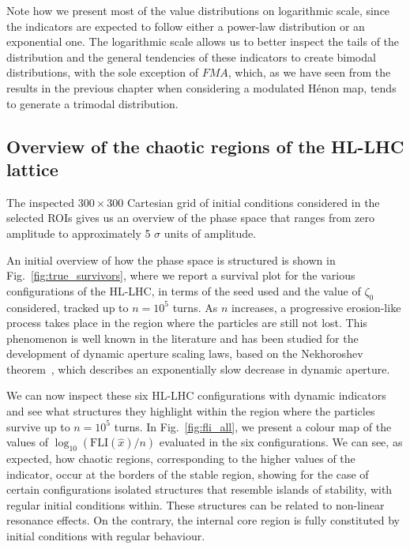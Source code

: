 Note how we present most of the value distributions on logarithmic scale, since the indicators are expected to follow either a power-law distribution or an exponential one. The logarithmic scale allows us to better inspect the tails of the distribution and the general tendencies of these indicators to create bimodal distributions, with the sole exception of $FMA$, which, as we have seen from the results in the previous chapter when considering a modulated Hénon map, tends to generate a trimodal distribution.

\subsection{Overview of the chaotic regions of the HL-LHC lattice}

The inspected $300\times300$ Cartesian grid of initial conditions considered in the selected ROIs gives us an overview of the phase space that ranges from zero amplitude to approximately 5 $\sigma$ units of amplitude.

An initial overview of how the phase space is structured is shown in Fig.~\ref{fig:true_survivors}, where we report a survival plot for the various configurations of the HL-LHC, in terms of the seed used and the value of $\zeta_0$ considered, tracked up to $n=10^5$ turns. As $n$ increases, a progressive erosion-like process takes place in the region where the particles are still not lost. This phenomenon is well known in the literature and has been studied for the development of dynamic aperture scaling laws, based on the Nekhoroshev theorem~\cite{Bazzani:2019csk}, which describes an exponentially slow decrease in dynamic aperture.

We can now inspect these six HL-LHC configurations with dynamic indicators and see what structures they highlight within the region where the particles survive up to $n=10^5$ turns. In Fig.~\ref{fig:fli_all}, we present a colour map of the values of $\log_{10}(\mathrm{FLI}(\hat{x})/n)$ evaluated in the six configurations. We can see, as expected, how chaotic regions, corresponding to the higher values of the indicator, occur at the borders of the stable region, showing for the case of certain configurations isolated structures that resemble islands of stability, with regular initial conditions within. These structures can be related to non-linear resonance effects. On the contrary, the internal core region is fully constituted by initial conditions with regular behaviour.

